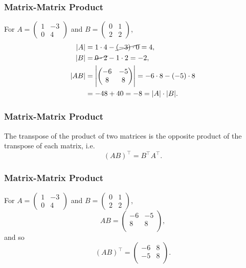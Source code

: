 \begin{frame}
  \frametitle{Matrix-Matrix Product}
  \begin{presentation_example}
    For $A=\begin{pmatrix} 1 & -3 \\ 0 & 4 \end{pmatrix}$ and $B=\begin{pmatrix} 0 & 1 \\ 2 & 2 \end{pmatrix}$,
    \begin{align*}
      |A| &= 1\cdot4 - \cancel{(-3)\cdot0} = 4,\\
      |B| &= \cancel{0\cdot2} - 1\cdot2 = -2,\\
      |AB| &= \left|\begin{pmatrix} -6&-5 \\ 8&8 \\ \end{pmatrix}\right| = -6\cdot8 - (-5)\cdot8\\
      &= -48 + 40 = -8 = |A|\cdot|B|.
    \end{align*}
  \end{presentation_example}
\end{frame}

\begin{frame}
  \frametitle{Matrix-Matrix Product}
  The transpose of the product of two matrices is the opposite product of the transpose of each matrix, i.e.
  \begin{equation*}
    \left( AB \right)^{\top} = B^{\top}A^{\top}.
  \end{equation*}
\end{frame}

\begin{frame}
  \frametitle{Matrix-Matrix Product}
  \begin{presentation_example}
    For $A=\begin{pmatrix} 1 & -3 \\ 0 & 4 \end{pmatrix}$ and $B=\begin{pmatrix} 0 & 1 \\ 2 & 2 \end{pmatrix}$,
    \begin{equation*}
      AB = \begin{pmatrix} -6&-5 \\ 8&8 \\ \end{pmatrix},
    \end{equation*}
    and so
    \begin{equation*}
      \left( AB \right)^{\top} = \begin{pmatrix} -6 & 8 \\ -5 & 8 \\ \end{pmatrix}.
    \end{equation*}
  \end{presentation_example}
\end{frame}

